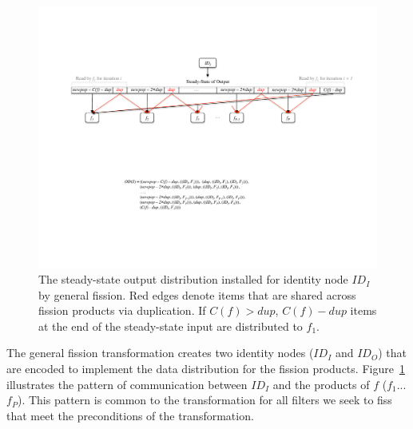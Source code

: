 \begin{figure}
\centering
\includegraphics[width=6.0in]{figures/split-pattern.pdf}
\caption[The output distribution required for general
fission.]{
The steady-state output distribution installed for identity node
$ID_I$ by general fission.  Red edges denote items that are shared
across fission products via duplication. If $C(f) > dup$, $C(f) - dup$ items at the end of the
steady-state input are distributed to $f_1$. \label{fig:split-pattern}}
\end{figure}

The general fission transformation creates two identity nodes ($ID_I$
and $ID_O$) that are encoded to implement the data distribution for
the fission products.  Figure~\ref{fig:split-pattern} illustrates the
pattern of communication between $ID_I$ and the products of $f$
($f_1$... $f_P$).  This pattern is common to the transformation for
all filters we seek to fiss that meet the preconditions of the
transformation.

